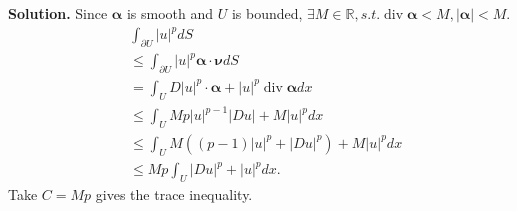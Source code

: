 \documentclass[a4paper]{book}
\newenvironment{solution}%
{\noindent\textbf{Solution.}}%
{\qedhere}
\numberwithin{equation}{chapter}
\theoremstyle{definition}
\begin{document}
\begin{solution}
  Since $\bm{\alpha}$ is smooth and $U$ is bounded, $\exists M \in \mathbb{R},s.t.\operatorname{div} \bm{\alpha} < M, \left| \bm{\alpha} \right| < M$.
  \begin{align*}
    &\int_{\partial U} \left| u \right|^p dS \\
    &\leq \int_{\partial U} \left| u \right|^p \bm{\alpha} \cdot \bm{\nu} dS \\
    &= \int_U D \left| u \right|^p \cdot \bm{\alpha} + \left| u \right|^p \operatorname{div} \bm{\alpha} dx \\
    &\leq \int_U Mp \left| u \right|^{p-1} \left| D u \right| + M \left| u \right|^p dx \\
    &\leq \int_U M ((p-1)\left| u \right|^p + \left| Du \right|^p) + M   \left| u \right|^p dx \\
    &\leq Mp  \int_{U}|D u|^{p}+|u|^{p} d x .
  \end{align*}
  Take $C = Mp$ gives the trace inequality.
\end{solution}





%   

%   


\end{document}
